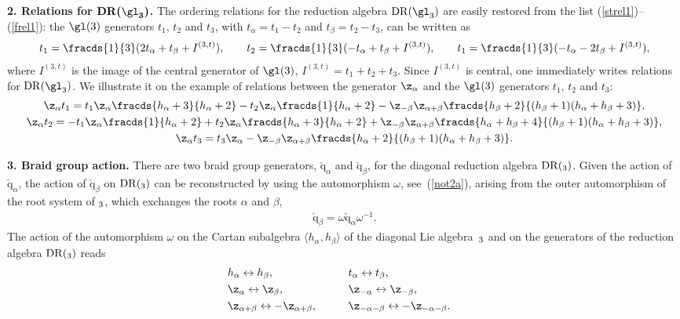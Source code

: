 \documentclass[pdftex]{sigma}
\def\a{\alpha}\def\Ar{{\rm A}}\def\Ab{\bar{\rm A}}\def\b{\beta}\def\bb{\mathfrak{b}}
\def\q{\check{\mathrm q}}\def\Q{\mathrm{Q}}\def\r#1{(\ref{#1})}\let\rf=\r
\numberwithin{equation}{section}
\begin{document}
{\bf 2. Relations for $\boldsymbol{{\mathrm{DR}}(\gl_3)}$.} The ordering relations for the reduction algebra ${\mathrm{DR}}(\gl_3)$ are easily restored from
the list \rf{strel1}--\rf{frel1}: the $\gl(3)$ generators $t_1$, $t_2$ and $t_3$, with $t_\a =t_1-t_2$ and $t_\b =t_2-t_3$, can be written as
\begin{gather*}
 t_1=  \fracds{1}{3}(2t_\a +t_\b +I^{(3,t)})  ,\qquad
t_2= \fracds{1}{3}(-t_\a +t_\b +I^{(3,t)}) ,\qquad
t_1= \fracds{1}{3}(-t_\a -2t_\b +I^{(3,t)}) ,
\end{gather*}
where $I^{(3,t)}$ is the image of the central generator of $\gl(3)$, $I^{(3,t)}=t_1+t_2+t_3$. Since $I^{(3,t)}$ is central, one immediately writes relations for
${\mathrm{DR}}(\gl_3)$. We illustrate it on the example of relations between the generator $\z_\a$ and the  $\gl(3)$ generators $t_1$, $t_2$ and $t_3$:
\begin{gather*}
\z_\a t_1=t_1\z_\a\fracds{h_\a +3}{h_\a +2}-t_2\z_\a\fracds{1}{h_\a +2}-\z_{-\b}\z_{\a +\b}
\fracds{h_\b +2}{(h_\b +1)(h_\a +h_\b +3)}  ,\\
 \z_\a t_2=-t_1\z_\a\fracds{1}{h_\a +2}+t_2\z_\a\fracds{h_\a +3}{h_\a +2}+\z_{-\b}\z_{\a +\b}
\fracds{h_\a +h_\b +4}{(h_\b +1)(h_\a +h_\b +3)}  ,\\
 \z_\a t_3=t_3\z_\a-\z_{-\b}\z_{\a +\b}\fracds{h_\a +2}{(h_\b +1)(h_\a +h_\b +3)}  .
\end{gather*}

{\bf 3. Braid group action.} There are two braid group generators, $\q_\a$ and $\q_\b$, for the diagonal reduction algebra ${\mathrm{DR}}(\sl_3)$.
Given the action of $\q_\a$, the action of $\q_\b$ on ${\mathrm{DR}}(\sl_3)$ can be reconstructed by using the automorphism $\omega$, see~\rf{not2a},
arising from the outer automorphism of the root system of $\sl_3$, which exchanges the roots $\a$ and $\b$,
\begin{gather*}
 \q_\b =\omega \q_\a \omega^{-1}  .
\end{gather*}
The action of the automorphism $\omega$ on the Cartan subalgebra $\langle h_\a ,h_\b\rangle$ of the diagonal Lie algebra~$\sl_3$ and on the generators of the reduction algebra ${\mathrm{DR}}(\sl_3)$ reads
\begin{alignat*}{3}
&h_\a\leftrightarrow h_\b ,\qquad && t_\a\leftrightarrow t_\b ,& \nonumber\\
&\z_\a\leftrightarrow \z_\b ,\qquad &&\z_{-\a}\leftrightarrow \z_{-\b} ,& \\
&\z_{\a +\b}\leftrightarrow -\z_{\a +\b} ,\qquad && \z_{-\a -\b}\leftrightarrow -\z_{-\a -\b} .\nonumber
\end{alignat*}
\end{document}
